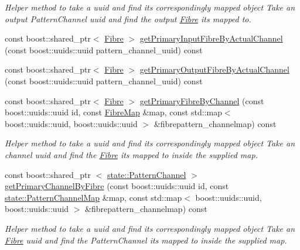\begin{DoxyCompactItemize}
\begin{DoxyCompactList}\small\item\em \-Helper method to take a uuid and find its correspondingly mapped object \-Take an output \-Pattern\-Channel uuid and find the output \hyperlink{classcryomesh_1_1structures_1_1Fibre}{\-Fibre} its mapped to. \end{DoxyCompactList}\item 
const boost\-::shared\-\_\-ptr$<$ \hyperlink{classcryomesh_1_1structures_1_1Fibre}{\-Fibre} $>$ \hyperlink{classcryomesh_1_1structures_1_1Bundle_ad80f4bbb8bdc379e156282bf0b17fbc3}{get\-Primary\-Input\-Fibre\-By\-Actual\-Channel} (const boost\-::uuids\-::uuid pattern\-\_\-channel\-\_\-uuid) const 
\item 
const boost\-::shared\-\_\-ptr$<$ \hyperlink{classcryomesh_1_1structures_1_1Fibre}{\-Fibre} $>$ \hyperlink{classcryomesh_1_1structures_1_1Bundle_ae6ccd53821a90466d96ebcbf171549a2}{get\-Primary\-Output\-Fibre\-By\-Actual\-Channel} (const boost\-::uuids\-::uuid pattern\-\_\-channel\-\_\-uuid) const 
\item 
const boost\-::shared\-\_\-ptr$<$ \hyperlink{classcryomesh_1_1structures_1_1Fibre}{\-Fibre} $>$ \hyperlink{classcryomesh_1_1structures_1_1Bundle_aecdb1fc4017f4e4aa954b4158e99c86f}{get\-Primary\-Fibre\-By\-Channel} (const boost\-::uuids\-::uuid id, const \hyperlink{classcryomesh_1_1structures_1_1FibreMap}{\-Fibre\-Map} \&map, const std\-::map$<$ boost\-::uuids\-::uuid, boost\-::uuids\-::uuid $>$ \&fibrepattern\-\_\-channelmap) const 
\begin{DoxyCompactList}\small\item\em \-Helper method to take a uuid and find its correspondingly mapped object \-Take an channel uuid and find the \hyperlink{classcryomesh_1_1structures_1_1Fibre}{\-Fibre} its mapped to inside the supplied map. \end{DoxyCompactList}\item 
const boost\-::shared\-\_\-ptr\*
$<$ \hyperlink{classcryomesh_1_1state_1_1PatternChannel}{state\-::\-Pattern\-Channel} $>$ \hyperlink{classcryomesh_1_1structures_1_1Bundle_a237b9698b966c6498fb723f685292599}{get\-Primary\-Channel\-By\-Fibre} (const boost\-::uuids\-::uuid id, const \hyperlink{classcryomesh_1_1state_1_1PatternChannelMap}{state\-::\-Pattern\-Channel\-Map} \&map, const std\-::map$<$ boost\-::uuids\-::uuid, boost\-::uuids\-::uuid $>$ \&fibrepattern\-\_\-channelmap) const 
\begin{DoxyCompactList}\small\item\em \-Helper method to take a uuid and find its correspondingly mapped object \-Take an \hyperlink{classcryomesh_1_1structures_1_1Fibre}{\-Fibre} uuid and find the \-Pattern\-Channel its mapped to inside the supplied map. \end{DoxyCompactList}\end{DoxyCompactItemize}
